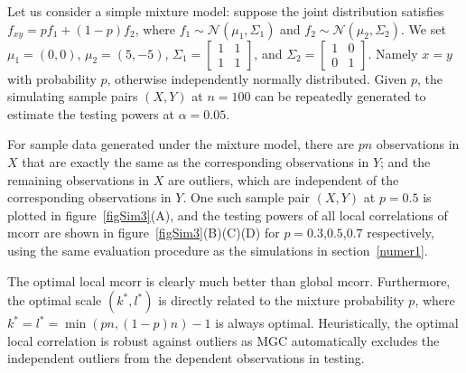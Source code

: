 \documentclass[11pt]{article}
\providecommand{\mc}[1]{\mathcal{#1}}
\begin{document}
Let us consider a simple mixture model: suppose the joint distribution satisfies $f_{xy}=p f_{1}+(1-p) f_{2}$, where $f_{1} \sim \mc{N}(\mu_{1},\Sigma_{1})$ and $f_{2} \sim \mc{N}(\mu_{2},\Sigma_{2})$. We set $\mu_{1}=(0,0)$, $\mu_{2}=(5,-5)$, $\Sigma_{1} = \begin{bmatrix} 1&1\\ 1&1 \end{bmatrix}$, and $\Sigma_{2} = \begin{bmatrix} 1&0\\ 0&1 \end{bmatrix}$. Namely $x=y$ with probability $p$, otherwise independently normally distributed. Given $p$, the simulating sample pairs $(X,Y)$ at $n=100$ can be repeatedly generated to estimate the testing powers at $\alpha=0.05$. 
%
%
%
%
%
%
%
%

For sample data generated under the mixture model, there are $pn$ observations in $X$ that are exactly the same as the corresponding observations in $Y$; and the remaining observations in $X$ are outliers, which are independent of the corresponding observations in $Y$. One such sample pair $(X,Y)$ at $p=0.5$ is plotted in figure~\ref{figSim3}(A), and the testing powers of all local correlations of mcorr are shown in figure~\ref{figSim3}(B)(C)(D) for $p=0.3$,$0.5$,$0.7$ respectively, using the same evaluation procedure as the simulations in section~\ref{numer1}.

The optimal local mcorr is clearly much better than global mcorr. Furthermore, the optimal scale $(k^{*},l^{*})$ is directly related to the mixture probability $p$, where $k^{*}=l^{*}=\min(pn,(1-p)n)-1$ is always optimal. Heuristically, the optimal local correlation is robust against outliers as MGC automatically excludes the independent outliers from the dependent observations in testing.
\end{document}
